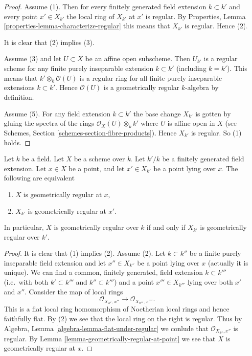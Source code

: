 \begin{proof}
Assume (1). Then for every finitely generated field extension
$k \subset k'$ and
every point $x' \in X_{k'}$ the local ring of $X_{k'}$ at $x'$
is regular. By Properties, Lemma \ref{properties-lemma-characterize-regular}
this means that $X_{k'}$ is regular. Hence (2).

\medskip\noindent
It is clear that (2) implies (3).

\medskip\noindent
Assume (3) and let $U \subset X$ be an affine open subscheme.
Then $U_{k'}$ is a regular scheme for any finite purely inseparable
extension $k \subset k'$ (including $k = k'$). This means that
$k' \otimes_k \mathcal{O}(U)$ is a regular ring for all
finite purely inseparable extensions $k \subset k'$. Hence
$\mathcal{O}(U)$ is a geometrically regular $k$-algebra by definition.

\medskip\noindent
Assume (5). For any field extension $k \subset k'$ the base
change $X_{k'}$ is gotten by gluing the spectra of the
rings $\mathcal{O}_X(U) \otimes_k k'$ where $U$ is affine open
in $X$ (see Schemes, Section \ref{schemes-section-fibre-products}).
Hence $X_{k'}$ is regular. So (1) holds.
\end{proof}

\begin{lemma}
\label{lemma-geometrically-regular-upstairs}
Let $k$ be a field.
Let $X$ be a scheme over $k$.
Let $k'/k$ be a finitely generated field extension.
Let $x \in X$ be a point, and let $x' \in X_{k'}$ be a point lying over $x$.
The following are equivalent
\begin{enumerate}
\item $X$ is geometrically regular at $x$,
\item $X_{k'}$ is geometrically regular at $x'$.
\end{enumerate}
In particular, $X$ is geometrically regular over $k$ if and only if
$X_{k'}$ is geometrically regular over $k'$.
\end{lemma}

\begin{proof}
It is clear that (1) implies (2). Assume (2).
Let $k \subset k''$ be a finite purely inseparable field extension
and let $x'' \in X_{k''}$ be a point lying over $x$ (actually it is
unique). We can find a common, finitely generated, field extension
$k \subset k'''$ (i.e.\ with both $k' \subset k'''$ and $k'' \subset k'''$)
and a point $x''' \in X_{k'''}$ lying over both $x'$ and $x''$.
Consider the map of local rings
$$
\mathcal{O}_{X_{k''}, x''} \longrightarrow \mathcal{O}_{X_{k'''}, x''''}.
$$
This is a flat local ring homomorphism of Noetherian local rings
and hence faithfully flat.
By (2) we see that the local ring on the right is regular.
Thus by Algebra, Lemma \ref{algebra-lemma-flat-under-regular}
we conlude that $\mathcal{O}_{X_{k''}, x''}$ is regular.
By Lemma \ref{lemma-geometrically-regular-at-point} we see that $X$
is geometrically regular at $x$.
\end{proof}

